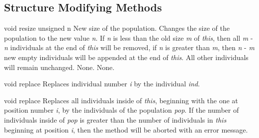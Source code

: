 \subsection{Structure Modifying Methods}

\setNormalInstance
\printMethodWithOneParam
{void}
{resize}
{unsigned}
{n}
{New size of the population.}
{Changes the size of the population to the new value {\em n}. If {\em n}
 is less than the old size {\em m} of {\em this}, then all {\em m} - {\em n}
 individuals at the end of {\em this} will be removed, if {\em n} is greater
 than {\em m}, then {\em n} - {\em m} new empty individuals will be
 appended at the end of {\em this}. All other individuals will remain
 unchanged.} 
{None.}
{None.}

\vspace*{4ex}

\setNormalInstance
\setCorrectWidthThree{8pt}
\printMethodWithParamsSaved
{void}
{}
{replace}
{Replaces individual number {\em i} by the individual {\em ind}.}
{}
\setCorrectWidthThree{4pt}

\vspace*{4ex}

\setNormalInstance
\setCorrectWidthThree{8pt}
\printMethodWithParamsSaved
{void}
{}
{replace}
{Replaces all individuals inside of {\em this}, beginning with the one
 at position number {\em i}, by the individuals of the population {\em pop}.
 If the number of individuals inside of {\em pop} is greater than the
 number of individuals in {\em this} beginning at position {\em i}, then
 the method will be aborted with an error message.}
{}
\setCorrectWidthThree{4pt}

